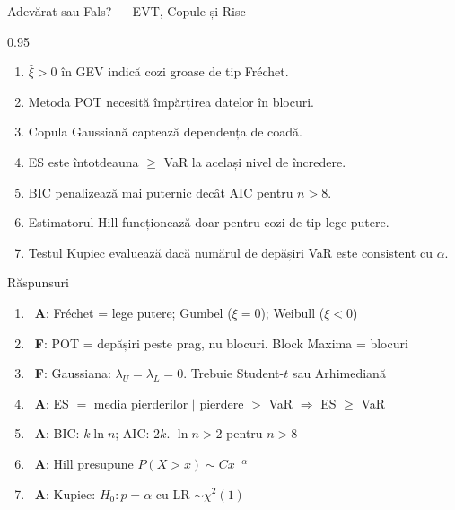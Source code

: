 \documentclass[9pt, aspectratio=169, t]{beamer}
\begin{document}
\begin{frame}{Adevărat sau Fals? --- EVT, Copule și Risc}
\begin{cminipage}{0.95\textwidth}
    \small
    \begin{enumerate}\setlength{\itemsep}{-1pt}
        \item $\hat{\xi} > 0$ în GEV indică cozi groase de tip Fréchet.
        \item Metoda POT necesită împărțirea datelor în blocuri.
        \item Copula Gaussiană captează dependența de coadă.
        \item ES este întotdeauna $\geq$ VaR la același nivel de încredere.
        \item BIC penalizează mai puternic decât AIC pentru $n > 8$.
        \item Estimatorul Hill funcționează doar pentru cozi de tip lege putere.
        \item Testul Kupiec evaluează dacă numărul de depășiri VaR este consistent cu $\alpha$.
    \end{enumerate}
    \vspace{0.1cm}
    \begin{exampleblock}{Răspunsuri}
    \scriptsize
    \begin{enumerate}\setlength{\itemsep}{0pt}
        \item \correct\ \textbf{A}: Fréchet = lege putere; Gumbel ($\xi=0$); Weibull ($\xi<0$)
        \item \incorrect\ \textbf{F}: POT = depășiri peste prag, nu blocuri. Block Maxima = blocuri
        \item \incorrect\ \textbf{F}: Gaussiana: $\lambda_U = \lambda_L = 0$. Trebuie Student-$t$ sau Arhimediană
        \item \correct\ \textbf{A}: ES $=$ media pierderilor $\mid$ pierdere $>$ VaR $\Rightarrow$ ES $\geq$ VaR
        \item \correct\ \textbf{A}: BIC: $k\ln n$; AIC: $2k$. $\ln n > 2$ pentru $n > 8$
        \item \correct\ \textbf{A}: Hill presupune $P(X > x) \sim Cx^{-\alpha}$
        \item \correct\ \textbf{A}: Kupiec: $H_0: p = \alpha$ cu LR $\sim \chi^2(1)$
    \end{enumerate}
    \end{exampleblock}
\end{cminipage}
\end{frame}

\end{document}
